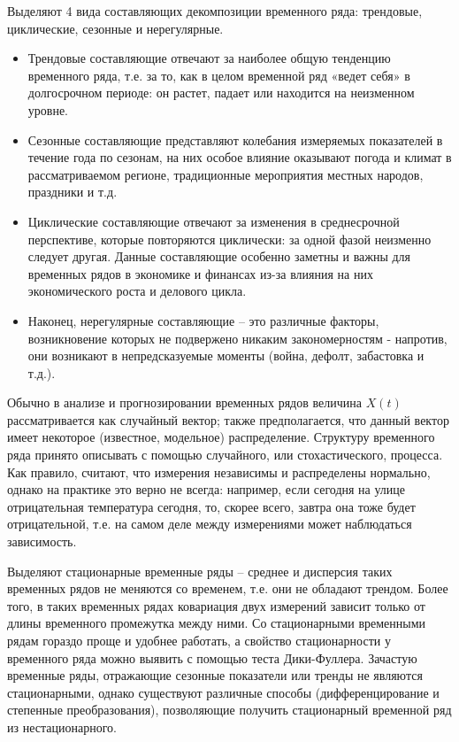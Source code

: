 \documentclass[14pt, letterpaper]{extarticle}
\begin{document}
Выделяют 4 вида составляющих декомпозиции временного ряда: трендовые, циклические, сезонные и нерегулярные. 

\begin{itemize}
  \item Трендовые составляющие отвечают за наиболее общую тенденцию временного ряда, т.е. за то, как в целом временной ряд «ведет себя» в долгосрочном периоде: он растет, падает или находится на неизменном уровне.
  \item Сезонные составляющие представляют колебания измеряемых показателей в течение года по сезонам, на них особое влияние оказывают погода и климат в рассматриваемом регионе, традиционные мероприятия местных народов, праздники и т.д.
  \item Циклические составляющие отвечают за изменения в среднесрочной перспективе, которые повторяются циклически: за одной фазой неизменно следует другая. Данные составляющие особенно заметны и важны для временных рядов в экономике и финансах из-за влияния на них экономического роста и делового цикла. 
  \item Наконец, нерегулярные составляющие – это различные факторы, возникновение которых не подвержено никаким закономерностям - напротив, они возникают в непредсказуемые моменты (война, дефолт, забастовка и т.д.).
\end{itemize}

Обычно в анализе и прогнозировании временных рядов величина $X(t)$ рассматривается как случайный вектор; также предполагается, что данный вектор имеет некоторое (известное, модельное) распределение. Структуру временного ряда принято описывать с помощью случайного, или стохастического, процесса. Как правило, считают, что измерения независимы и распределены нормально, однако на практике это верно не всегда: например, если сегодня на улице отрицательная температура сегодня, то, скорее всего, завтра она тоже будет отрицательной, т.е. на самом деле между измерениями может наблюдаться зависимость.

Выделяют стационарные временные ряды – среднее и дисперсия таких временных рядов не меняются со временем, т.е. они не обладают трендом. Более того, в таких временных рядах ковариация двух измерений зависит только от длины временного промежутка между ними. Со стационарными временными рядам гораздо проще и удобнее работать, а свойство стационарности у временного ряда можно выявить с помощью теста Дики-Фуллера. Зачастую временные ряды, отражающие сезонные показатели или тренды не являются стационарными, однако существуют различные способы (дифференцирование и степенные преобразования), позволяющие получить стационарный временной ряд из нестационарного. 
\end{document}
